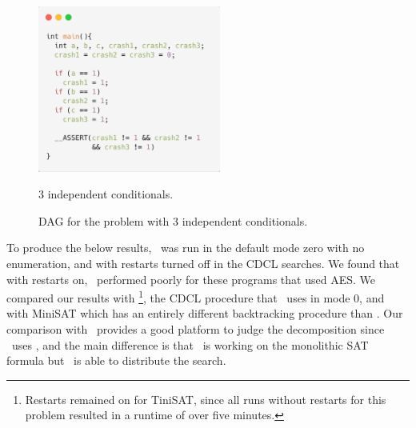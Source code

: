 \documentclass[
10pt, %
a4paper, %
oneside, %
headinclude,footinclude, %
BCOR5mm, %
]{scrartcl}
\begin{document}
\begin{figure}[!ht]
    \centering
    \begin{minipage}{0.45\textwidth}
        \centering

  \includegraphics[width=6cm]{./figs/ex2_code.png}
  \caption{3 independent conditionals.}
  \label{ex2_code}

    \end{minipage}\hfill
    \begin{minipage}{0.45\textwidth}
        \centering
  \caption{DAG for the problem with 3 independent conditionals.}
  \label{ex2_dag}
    \end{minipage}
\end{figure}

To produce the below results, \dagster\ was run in the default mode zero with no enumeration, and with restarts turned off in the CDCL searches.
We found that with restarts on, \dagster\ performed poorly for these programs that used AES. We compared our results with \tinisat\footnote{Restarts remained on for TiniSAT, since all runs without restarts for this problem resulted in a runtime of over five minutes.}, the CDCL procedure that \dagster\ uses in mode 0, and with {\textsc MiniSAT} which has an entirely different backtracking procedure than \tinisat.
Our comparison with \tinisat\ provides a good platform to judge the decomposition since \dagster\ uses \tinisat, and the main difference is that \tinisat\ is working on the monolithic SAT formula but \dagster\ is able to distribute the search.
\end{document}
